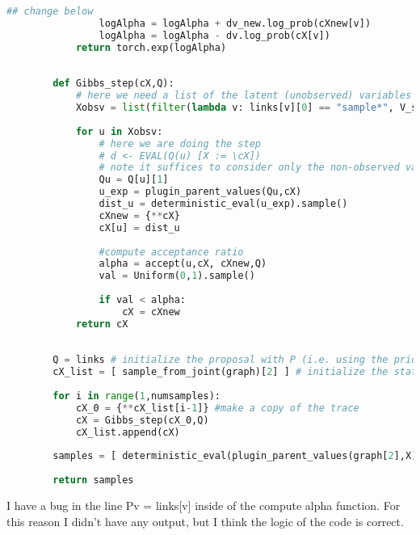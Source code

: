 \documentclass[12pt]{article}%
\theoremstyle{definition}
\newcommand{\cX}{{\mathcal X}}
\begin{document}
\begin{lstlisting}[language=Python]
	            ## change below
	            logAlpha = logAlpha + dv_new.log_prob(cXnew[v])
	            logAlpha = logAlpha - dv.log_prob(cX[v])
	        return torch.exp(logAlpha)
	
	    
	    def Gibbs_step(cX,Q):
	        # here we need a list of the latent (unobserved) variables
	        Xobsv = list(filter(lambda v: links[v][0] == "sample*", V_sorted))
	
	        for u in Xobsv:
	            # here we are doing the step
	            # d <- EVAL(Q(u) [X := \cX]) 
	            # note it suffices to consider only the non-observed variables
	            Qu = Q[u][1]
	            u_exp = plugin_parent_values(Qu,cX)
	            dist_u = deterministic_eval(u_exp).sample()
	            cXnew = {**cX}
	            cX[u] = dist_u
	
	            #compute acceptance ratio
	            alpha = accept(u,cX, cXnew,Q)
	            val = Uniform(0,1).sample()
	
	            if val < alpha:
	                cX = cXnew
	        return cX
	
	
	    Q = links # initialize the proposal with P (i.e. using the prior)
	    cX_list = [ sample_from_joint(graph)[2] ] # initialize the state/trace
	
	    for i in range(1,numsamples):
	        cX_0 = {**cX_list[i-1]} #make a copy of the trace
	        cX = Gibbs_step(cX_0,Q)
	        cX_list.append(cX)
	    
	    samples = [ deterministic_eval(plugin_parent_values(graph[2],X)) for X in cX_list ]
	
	    return samples
	\end{lstlisting}	


	I have a bug in the line Pv = links[v] inside of the compute alpha function. For this reason I didn't have any output, but I think the logic of the code is correct.
	
	
	
	
	

		
		
	
	
	
%	
%	
	
	
\end{document}
